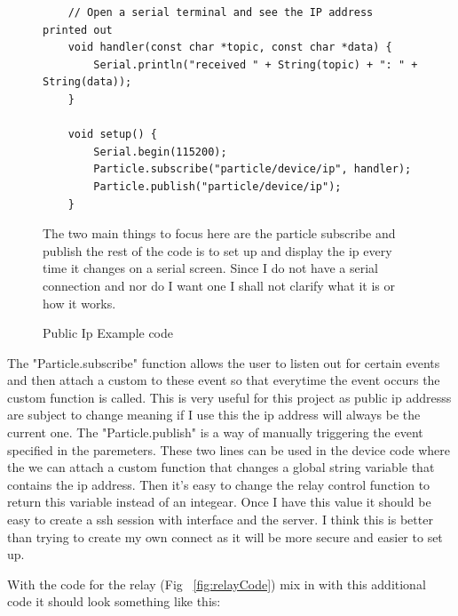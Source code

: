 \documentclass{article}
\begin{document}
\begin{figure}[h]
    \begin{lstlisting}
    // Open a serial terminal and see the IP address printed out
    void handler(const char *topic, const char *data) {
        Serial.println("received " + String(topic) + ": " + String(data));
    }

    void setup() {
        Serial.begin(115200);
        Particle.subscribe("particle/device/ip", handler);
        Particle.publish("particle/device/ip");
    }
    \end{lstlisting}
    \caption{Public Ip Example code} \label{fig:publicIpExample}
    The two main things to focus here are the particle subscribe and publish the rest of the
    code is to set up and display the ip every time it changes on a serial screen. Since
    I do not have a serial connection and nor do I want one I shall not clarify what it
    is or how it works.
\end{figure}

The "Particle.subscribe" function allows the user to listen out for certain events and then
attach a custom to these event so that everytime the event occurs the custom function is
called. This is very useful for this project as  public ip addresss are subject to change meaning
if I use this the ip address will always be the current one. The "Particle.publish" is a way
of manually triggering the event specified in the paremeters. These two lines can be used
in the device code where the we can attach a custom function that changes a global string variable
that contains the ip address. Then it's easy to change the relay control function to return this
variable instead of an integear. Once I have this value it should be easy to create a ssh session
with interface and the server. I think this is better than trying to create my own connect as it
will be more secure and easier to set up.

With the code for the relay (Fig ~\ref{fig:relayCode}) mix in with this additional code it should look
something like this:
\end{document}
